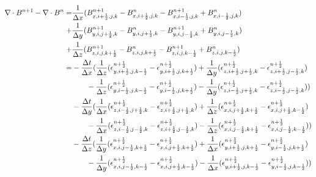 \documentclass[a4paper,10pt]{article}
\begin{document}
\begin{align}
\nabla \cdot B^{n+1}-\nabla \cdot B^{n}
=&\frac{1}{\Delta x}(B_{x,i+\frac{1}{2},j,k}^{n+1}-B_{x,i+\frac{1}{2},j,k}^n-B_{x,i-\frac{1}{2},j,k}^{n+1}+B_{x,i-\frac{1}{2},j,k}^n) \notag \\
+&\frac{1}{\Delta y}(B_{y,i,j+\frac{1}{2},k}^{n+1}-B_{y,i,j+\frac{1}{2},k}^n-B_{y,i,j-\frac{1}{2},k}^{n+1}+B_{y,i,j-\frac{1}{2},k}^n) \notag \\
+&\frac{1}{\Delta z}(B_{z,i,j,k+\frac{1}{2}}^{n+1}-B_{z,i,j,k+\frac{1}{2}}^n-B_{z,i,j,k-\frac{1}{2}}^{n+1}+B_{z,i,j,k-\frac{1}{2}}^n) \notag \\
=&-\frac{\Delta t}{\Delta x}(\frac{1}{\Delta z}(\epsilon_{y,i+\frac{1}{2},j,k-\frac{1}{2}}^{n+\frac{1}{2}}-\epsilon_{y,i+\frac{1}{2},j,k+\frac{1}{2}}^{n+\frac{1}{2}})+\frac{1}{\Delta y}(\epsilon_{z,i+\frac{1}{2},j+\frac{1}{2},k}^{n+\frac{1}{2}}-\epsilon_{z,i+\frac{1}{2},j-\frac{1}{2},k}^{n+\frac{1}{2}}) \notag \\
&\quad\quad-\frac{1}{\Delta z}(\epsilon_{y,i-\frac{1}{2},j,k-\frac{1}{2}}^{n+\frac{1}{2}}-\epsilon_{y,i-\frac{1}{2},j,k+\frac{1}{2}}^{n+\frac{1}{2}})-\frac{1}{\Delta y}(\epsilon_{z,i-\frac{1}{2},j+\frac{1}{2},k}^{n+\frac{1}{2}}-\epsilon_{z,i-\frac{1}{2},j-\frac{1}{2},k}^{n+\frac{1}{2}})) \notag \\
&-\frac{\Delta t}{\Delta y}(\frac{1}{\Delta x}(\epsilon_{z,i-\frac{1}{2},j+\frac{1}{2},k}^{n+\frac{1}{2}}-\epsilon_{z,i+\frac{1}{2},j+\frac{1}{2},k}^{n+\frac{1}{2}})+\frac{1}{\Delta z}(\epsilon_{x,i,j+\frac{1}{2},k+\frac{1}{2}}^{n+\frac{1}{2}}-\epsilon_{x,i,j+\frac{1}{2},k-\frac{1}{2}}^{n+\frac{1}{2}}) \notag \\
&\quad\quad-\frac{1}{\Delta x}(\epsilon_{z,i-\frac{1}{2},j-\frac{1}{2},k}^{n+\frac{1}{2}}-\epsilon_{z,i+\frac{1}{2},j-\frac{1}{2},k}^{n+\frac{1}{2}})-\frac{1}{\Delta z}(\epsilon_{x,i,j-\frac{1}{2},k+\frac{1}{2}}^{n+\frac{1}{2}}-\epsilon_{x,i,j-\frac{1}{2},k-\frac{1}{2}}^{n+\frac{1}{2}})) \notag \\
&-\frac{\Delta t}{\Delta z}(\frac{1}{\Delta y}(\epsilon_{x,i,j-\frac{1}{2},k+\frac{1}{2}}^{n+\frac{1}{2}}-\epsilon_{x,i,j+\frac{1}{2},k+\frac{1}{2}}^{n+\frac{1}{2}})+\frac{1}{\Delta x}(\epsilon_{y,i+\frac{1}{2},j,k+\frac{1}{2}}^{n+\frac{1}{2}}-\epsilon_{y,i-\frac{1}{2},j,k+\frac{1}{2}}^{n+\frac{1}{2}}) \notag \\
&\quad\quad-\frac{1}{\Delta y}(\epsilon_{x,i,j-\frac{1}{2},k-\frac{1}{2}}^{n+\frac{1}{2}}-\epsilon_{x,i,j+\frac{1}{2},k-\frac{1}{2}}^{n+\frac{1}{2}})-\frac{1}{\Delta x}(\epsilon_{y,i+\frac{1}{2},j,k-\frac{1}{2}}^{n+\frac{1}{2}}-\epsilon_{y,i-\frac{1}{2},j,k-\frac{1}{2}}^{n+\frac{1}{2}})) \notag \\

\end{align}
\end{document}
